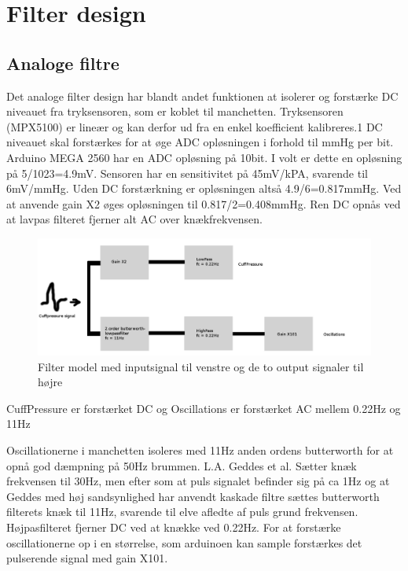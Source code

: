 \newpage
\chapter{Filter design} \label{title:filters}

\section{Analoge filtre}

Det analoge filter design har blandt andet funktionen at isolerer og forstærke DC niveauet fra tryksensoren, som er koblet til manchetten. Tryksensoren (MPX5100) er lineær og kan derfor ud fra en enkel koefficient kalibreres.1 DC niveauet skal forstærkes for at øge ADC opløsningen i forhold til mmHg per bit. Arduino MEGA 2560 har en ADC opløsning på 10bit. I volt er dette en opløsning på 5/1023=4.9mV. Sensoren har en sensitivitet på 45mV/kPA, svarende til 6mV/mmHg. Uden DC forstærkning er opløsningen altså 4.9/6=0.817mmHg. Ved at anvende gain X2 øges opløsningen til 0.817/2=0.408mmHg. Ren DC opnås ved at lavpas filteret fjerner alt AC over knækfrekvensen.

\begin{figure}[H]
	\includegraphics[width=\textwidth]{billeder/AnalogFilter.png}
	\caption{Filter model med inputsignal til venstre og de to output signaler	til højre}\label{pic:analogfilter}
\end{figure}
CuffPressure er forstærket DC og Oscillations er forstærket AC mellem 0.22Hz og 11Hz

Oscillationerne i manchetten isoleres med 11Hz anden ordens butterworth for at opnå god dæmpning på 50Hz brummen. L.A. Geddes et al. Sætter knæk frekvensen til 30Hz, men efter som at puls signalet befinder sig på ca 1Hz og at Geddes med høj sandsynlighed har anvendt kaskade filtre sættes butterworth filterets knæk til 11Hz, svarende til elve afledte af puls grund frekvensen. Højpasfilteret fjerner DC ved at knække ved 0.22Hz. For at forstærke oscillationerne op i en størrelse, som arduinoen kan sample forstærkes det pulserende signal med gain X101.

